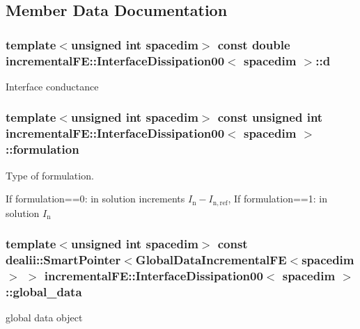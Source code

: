 \subsection{Member Data Documentation}
\subsubsection[{\texorpdfstring{d}{d}}]{\setlength{\rightskip}{0pt plus 5cm}template$<$unsigned int spacedim$>$ const double {\bf incremental\+F\+E\+::\+Interface\+Dissipation00}$<$ spacedim $>$\+::d\hspace{0.3cm}{\ttfamily [private]}}\hypertarget{classincremental_f_e_1_1_interface_dissipation00_a4d63c472bff8faf4f9b353210abe0408}{}\label{classincremental_f_e_1_1_interface_dissipation00_a4d63c472bff8faf4f9b353210abe0408}
Interface conductance 
\subsubsection[{\texorpdfstring{formulation}{formulation}}]{\setlength{\rightskip}{0pt plus 5cm}template$<$unsigned int spacedim$>$ const unsigned int {\bf incremental\+F\+E\+::\+Interface\+Dissipation00}$<$ spacedim $>$\+::formulation\hspace{0.3cm}{\ttfamily [private]}}\hypertarget{classincremental_f_e_1_1_interface_dissipation00_af553895ff96caf817cbc2a4c66800384}{}\label{classincremental_f_e_1_1_interface_dissipation00_af553895ff96caf817cbc2a4c66800384}
Type of formulation.

If {\ttfamily formulation==0}\+: in solution increments $I_\mathrm{n}-I_\mathrm{n,ref}$, If {\ttfamily formulation==1}\+: in solution $I_\mathrm{n}$ 
\subsubsection[{\texorpdfstring{global\+\_\+data}{global_data}}]{\setlength{\rightskip}{0pt plus 5cm}template$<$unsigned int spacedim$>$ const dealii\+::\+Smart\+Pointer$<${\bf Global\+Data\+Incremental\+FE}$<$spacedim$>$ $>$ {\bf incremental\+F\+E\+::\+Interface\+Dissipation00}$<$ spacedim $>$\+::global\+\_\+data\hspace{0.3cm}{\ttfamily [private]}}\hypertarget{classincremental_f_e_1_1_interface_dissipation00_a4523806aae4061757a3c07c10081a4b0}{}\label{classincremental_f_e_1_1_interface_dissipation00_a4523806aae4061757a3c07c10081a4b0}
global data object 

